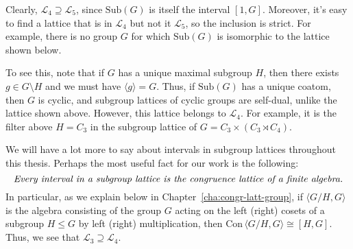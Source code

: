 \documentclass[cm,dissertation,actual,final]{uhthesis}
\theoremstyle{plain}
\theoremstyle{definition}
\theoremstyle{remark}
\numberwithin{theorem}{section}
\numberwithin{claim}{chapter}
\numberwithin{equation}{section}
\numberwithin{conjecture}{chapter}
\newcommand{\<}{\ensuremath{\langle}}
\renewcommand{\>}{\ensuremath{\rangle}}
\renewcommand{\leq}{\ensuremath{\leqslant}}
\newcommand{\Con}{\ensuremath{\mathrm{Con\,}}}
\newcommand{\Sub}{\ensuremath{\mathrm{Sub}}}
\newcommand{\GAP}{\textsf{GAP}}
\newcommand{\0}{\ensuremath{\mathbf{0}}}
\newcommand{\1}{\ensuremath{\mathbf{1}}}
\newcommand{\2}{\ensuremath{\mathbf{2}}}
\newcommand{\3}{\ensuremath{\mathbf{3}}}
\newcommand{\4}{\ensuremath{\mathbf{4}}}
\newcommand{\5}{\ensuremath{\mathbf{5}}}
\newcommand{\sL}{\ensuremath{\mathscr{L}}}
\begin{document}
Clearly,  $\sL_4 \supseteq \sL_5$, since $\Sub(G)$ is itself the interval 
$[1, G]$.  Moreover, it's easy to find a lattice that is in $\sL_4$ but not it
$\sL_5$, so the inclusion is strict.  For example, there is no group $G$ for which
$\Sub(G)$ is isomorphic to the lattice shown below.  
\begin{center}

\end{center}
To see this, note that if
$G$ has a unique maximal subgroup $H$, then there exists $g\in G\setminus
H$ and we must have $\< g\> = G$.  Thus, if $\Sub(G)$ has a unique
coatom, then $G$ is cyclic, and subgroup lattices of cyclic groups are
self-dual, unlike the lattice shown above.
However, this lattice belongs to $\sL_4$.  For example, it is the 
filter above $H = C_3$ in the subgroup lattice of $G = C_3 \times (C_3 \rtimes
C_4)$. %

We will have a lot more to say about intervals in subgroup lattices throughout
this thesis.
Perhaps the most useful fact for our work is the following:
\begin{equation}
  \label{eq:Intro1}
\text{\emph{Every interval in a subgroup lattice is the congruence lattice of
  a finite algebra.}}
\end{equation}
In particular, as we explain below in Chapter~\ref{cha:congr-latt-group}, if 
$\<G/H, G\>$ is the algebra consisting of the group $G$
acting on the left (right) cosets of a subgroup $H \leq G$ by left (right)
multiplication, then $\Con\<G/H, G\> \cong [H, G]$.
Thus, we see that $\sL_3 \supseteq \sL_4$.
\end{document}
